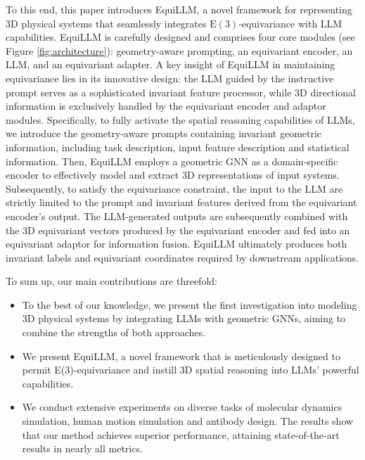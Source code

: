 To this end, this paper introduces EquiLLM, a novel framework for representing 3D physical systems that seamlessly integrates $\mathrm{E}(3)$-equivariance with LLM capabilities. 
EquiLLM is carefully designed and comprises four core modules (see Figure \ref{fig:architecture}): geometry-aware prompting, an equivariant encoder, an LLM, and an equivariant adapter. 
A key insight of EquiLLM in maintaining equivariance lies in its innovative design: the LLM guided by the instructive prompt serves as a sophisticated invariant feature processor, while 3D directional information is exclusively handled by the equivariant encoder and adaptor modules.
Specifically, to fully activate the spatial reasoning capabilities of LLMs, we introduce the geometry-aware prompts containing invariant geometric information, including task description, input
feature description and statistical information. Then, EquiLLM employs a geometric GNN as a domain-specific encoder to effectively model and extract 3D representations of input systems. Subsequently, to satisfy the equivariance constraint, the input to the LLM are strictly limited to the prompt and invariant features derived from the equivariant encoder's output. The LLM-generated outputs are subsequently combined with the 3D equivariant vectors produced by the equivariant encoder and fed into an equivariant adaptor for information fusion. EquiLLM ultimately produces both invariant labels and equivariant coordinates required by downstream applications.



To sum up, our main contributions are threefold:
\begin{itemize}
    \item To the best of our knowledge, we present the first investigation into modeling 3D physical systems by integrating LLMs with geometric GNNs, aiming to combine the strengths of both approaches.
    \item We present EquiLLM, a novel framework that is meticulously designed to permit E(3)-equivariance and instill 3D spatial reasoning into LLMs' powerful capabilities. 
    \item We conduct extensive experiments on diverse tasks of molecular dynamics simulation, human motion simulation and antibody design. The results show that our method achieves superior performance, attaining state-of-the-art results in nearly all metrics. 
\end{itemize}
